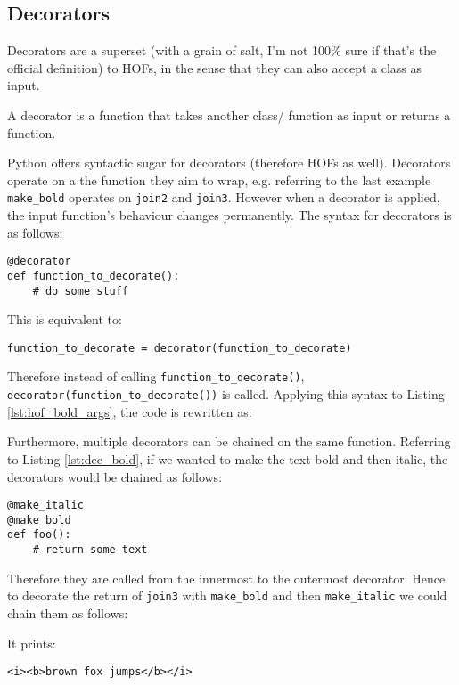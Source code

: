 \documentclass[a4paper]{article}
\begin{document}
\subsection{Decorators}

Decorators are  a superset (with a grain of salt, I'm not 100\% sure if that's the official definition) to HOFs, in the sense that they can also accept a class as input.
\begin{definition}[Decorator]
A decorator is a function that takes another class/ function as input or returns a function.
\end{definition}
Python offers syntactic sugar for decorators (therefore HOFs as well). Decorators operate on a the function they aim to wrap, e.g. referring to the last example \texttt{make\_bold} operates on \texttt{join2} and \texttt{join3}. However when a decorator is applied, the input function's behaviour changes permanently. The syntax for decorators is as follows:
\begin{verbatim}
@decorator
def function_to_decorate():
    # do some stuff
\end{verbatim}
This is equivalent to:
\begin{verbatim}
function_to_decorate = decorator(function_to_decorate)
\end{verbatim}

Therefore instead of calling \texttt{function\_to\_decorate()}, \texttt{decorator(function\_to\_decorate())} is called. Applying this syntax to Listing \ref{lst:hof_bold_args}, the code is rewritten as:



Furthermore, multiple decorators can be chained on the same function. Referring to Listing \ref{lst:dec_bold}, if we wanted to make the text bold and then italic, the decorators would be chained as follows:
\begin{verbatim}
@make_italic
@make_bold
def foo():
    # return some text
\end{verbatim}
Therefore they are called from the innermost to the outermost decorator. Hence to decorate the return of \texttt{join3} with \texttt{make\_bold} and then \texttt{make\_italic} we could chain them as follows:

It prints:
\begin{verbatim}
<i><b>brown fox jumps</b></i>
\end{verbatim}
\end{document}
